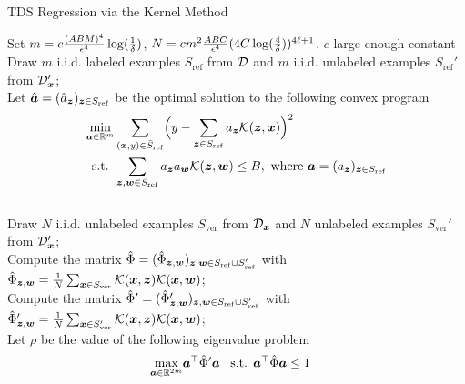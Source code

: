 \documentclass[11pt]{article} %
\numberwithin{equation}{section}
\begin{document}
\begin{algorithm}[t]
\caption{TDS Regression via the Kernel Method}\label{algorithm:tds-via-kernels}
\vspace{.25em}
Set $m = c\frac{(ABM)^4}{{\epsilon}^4}\log(\frac{1}{\delta})$, $N = c m^2\frac{ABC}{{\epsilon}^4}(4C\log(\frac{4}{\delta}))^{4\ell+1}$, $c$ large enough constant\\ %
\vspace{.25em}
Draw $m$ i.i.d. labeled examples $\bar{S}_{\mathrm{ref}}$ from ${\mathcal{D}}$ and $m$ i.i.d. unlabeled examples $S_{\mathrm{ref}}'$ from ${\mathcal{D}}_{{\bm{x}}}'$; \\
Let $\hat {{\bm{a}}} = (\hat a_{{\bm{z}}})_{{\bm{z}}\in S_{\mathrm{ref}}}$ be the optimal solution to the following convex program
\begin{align*}
    \min_{{\bm{a}} \in \mathbb{R}^m} &\sum_{({\bm{x}},y)\in \bar{S}_\mathrm{ref}}\Bigr(y-\sum_{{\bm{z}}\in S_{\mathrm{ref}}} a_{{\bm{z}}}\mathcal{K}({\bm{z}},{\bm{x}})\Bigr)^2 \\
    \text{s.t. } & \sum_{{\bm{z}},{\bm{w}}\in S_{\mathrm{ref}}} a_{{\bm{z}}}a_{{\bm{w}}} \mathcal{K}({\bm{z}},{\bm{w}}) \le B, \text{ where }{\bm{a}} = (a_{{\bm{z}}})_{{\bm{z}}\in S_{\mathrm{ref}}}
\end{align*}
\\
\vspace{.25em}
Draw $N$ i.i.d. unlabeled examples ${S}_{\mathrm{ver}}$ from ${\mathcal{D}}_{{\bm{x}}}$ and $N$ unlabeled examples $S_{\mathrm{ver}}'$ from ${\mathcal{D}}_{{\bm{x}}}'$; \\
Compute the matrix $\hat\Phi = (\hat\Phi_{{\bm{z}},{\bm{w}}})_{{\bm{z}},{\bm{w}}\in S_{\mathrm{ref}}\cup S_{\mathrm{ref}}'}$ with $\hat\Phi_{{\bm{z}},{\bm{w}}} = \frac{1}{N}\sum_{{\bm{x}}\in S_{\mathrm{ver}}}\mathcal{K}({\bm{x}},{\bm{z}})\mathcal{K}({\bm{x}},{\bm{w}})$;\\
Compute the matrix $\hat\Phi' = (\hat\Phi'_{{\bm{z}},{\bm{w}}})_{{\bm{z}},{\bm{w}}\in S_{\mathrm{ref}}\cup S_{\mathrm{ref}}'}$ with $\hat\Phi'_{{\bm{z}},{\bm{w}}} = \frac{1}{N}\sum_{{\bm{x}}\in S_{\mathrm{ver}}'}\mathcal{K}({\bm{x}},{\bm{z}})\mathcal{K}({\bm{x}},{\bm{w}})$;\\
Let $\rho$ be the value of the following eigenvalue problem
\begin{align*}
    \max_{\va \in \R^{2m}} & \va^\top\hat\Phi'\va \,\,\,\text{ s.t. } \va^\top\hat\Phi\va \le 1

\end{align*}
\end{algorithm}
\end{document}
